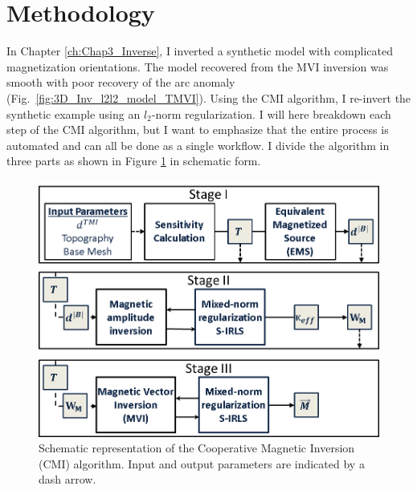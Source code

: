\section{Methodology}
In Chapter \ref{ch:Chap3_Inverse}, I inverted a synthetic model with complicated magnetization orientations. 
The model recovered from the MVI inversion was smooth with poor recovery of the arc anomaly (Fig.~\ref{fig:3D_Inv_l2l2_model_TMVI}).
Using the CMI algorithm, I re-invert the synthetic example using an $l_2$-norm regularization. 
I will here breakdown each step of the CMI algorithm, but I want to emphasize that the entire process is automated and can all be done as a single workflow.
I divide the algorithm in three parts as shown in Figure \ref{fig:Advanced_Mag_Inversion_Algo} in schematic form.

 \begin{figure}[h!]
\centering
\includegraphics[scale=0.6]{Advanced_Mag_Inversion_Algo.png}
\caption{ Schematic representation of the Cooperative Magnetic Inversion (CMI) algorithm. Input and output parameters are indicated by a dash arrow.}
\label{fig:Advanced_Mag_Inversion_Algo}
\end{figure}

